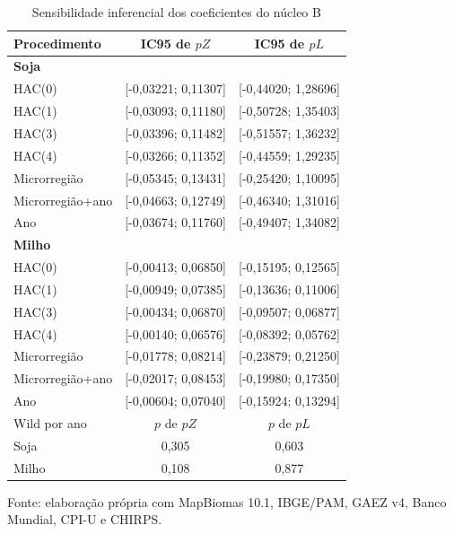 \begin{table}[htbp]
\centering
\small
\setlength{\tabcolsep}{3pt}
\renewcommand{\arraystretch}{1.1}
\normalcaption\captionstyle{\centering}
\caption{Sensibilidade inferencial dos coeficientes do núcleo B}
\label{tab:h1-inferencia-extra}
\begin{tabular}{lcc}
\hline
Procedimento & IC95 de $pZ$ & IC95 de $pL$ \\
\hline\multicolumn{3}{l}{\textbf{Soja}} \\
HAC(0) & [-0,03221; 0,11307] & [-0,44020; 1,28696] \\
HAC(1) & [-0,03093; 0,11180] & [-0,50728; 1,35403] \\
HAC(3) & [-0,03396; 0,11482] & [-0,51557; 1,36232] \\
HAC(4) & [-0,03266; 0,11352] & [-0,44559; 1,29235] \\
Microrregião & [-0,05345; 0,13431] & [-0,25420; 1,10095] \\
Microrregião+ano & [-0,04663; 0,12749] & [-0,46340; 1,31016] \\
Ano & [-0,03674; 0,11760] & [-0,49407; 1,34082] \\
\hline\multicolumn{3}{l}{\textbf{Milho}} \\
HAC(0) & [-0,00413; 0,06850] & [-0,15195; 0,12565] \\
HAC(1) & [-0,00949; 0,07385] & [-0,13636; 0,11006] \\
HAC(3) & [-0,00434; 0,06870] & [-0,09507; 0,06877] \\
HAC(4) & [-0,00140; 0,06576] & [-0,08392; 0,05762] \\
Microrregião & [-0,01778; 0,08214] & [-0,23879; 0,21250] \\
Microrregião+ano & [-0,02017; 0,08453] & [-0,19980; 0,17350] \\
Ano & [-0,00604; 0,07040] & [-0,15924; 0,13294] \\
\hline
Wild por ano & $p$ de $pZ$ & $p$ de $pL$ \\
Soja & 0,305 & 0,603 \\
Milho & 0,108 & 0,877 \\
\hline\end{tabular}
\par\smallskip
\begin{minipage}{\textwidth}\footnotesize\centering
Fonte: elaboração própria com MapBiomas 10.1, IBGE/PAM, GAEZ v4, Banco Mundial, CPI-U e CHIRPS.
\end{minipage}
\end{table}
